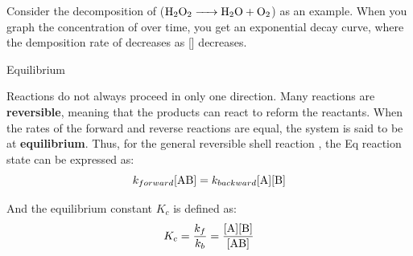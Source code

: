 \documentclass[10pt]{article}
\begin{document}
    Consider the decomposition of  ($\ce{H2O2 -> H2O + O2}$) as an example. When you graph the concentration of  over time, you get an exponential decay curve, where the demposition rate of  decreases as [] decreases.


    \begin{core}[label=placeholder2]{Equilibrium}
      
      Reactions do not always proceed in only one direction. Many reactions are \textbf{reversible}, meaning that the products can react to reform the reactants. When the rates of the forward and reverse reactions are equal, the system is said to be at \textbf{equilibrium}. Thus, for the general reversible shell reaction , the Eq reaction state can be expressed as:
      \[
        k_{forward}[\ce{AB}] = k_{backward}[\ce{A}][\ce{B}]
      \]

      And the equilibrium constant $K_c$ is defined as:
      \[
        K_c = \frac{k_f}{k_b} = \frac{[\ce{A}][\ce{B}]}{[\ce{AB}]}
      \]

    \end{core}
\end{document}
